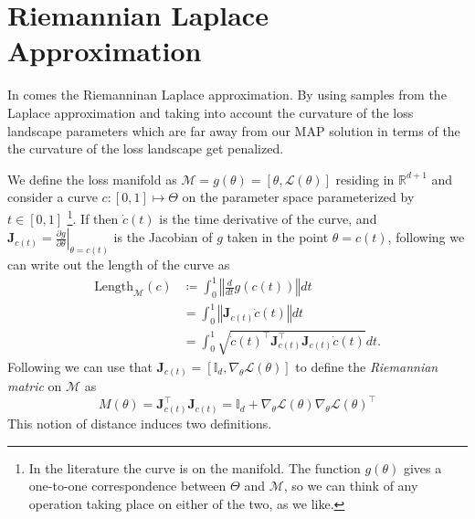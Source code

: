 \section{Riemannian Laplace Approximation}
In comes the Riemanninan Laplace approximation. By using samples from the Laplace approximation and taking into account the curvature of the loss landscape parameters which are far away from our MAP solution in terms of the the curvature of the loss landscape get penalized.

We define the loss manifold as $\mathcal M = g(\theta) = [\theta, \mathcal L(\theta)]$ residing in $\mathbb R^{d+1}$ and consider a curve $c:[0,1] \mapsto \Theta$ on the parameter space parameterized by $t\in [0,1]$ \footnote{In the literature the curve is on the manifold. The function $g(\theta)$ gives a one-to-one correspondence between $\Theta$ and $\mathcal M$, so we can think of any operation taking place on either of the two, as we like.}. If then $\dot c(t)$ is the time derivative of the curve, and $\bm J_{c(t)} = \left. \frac{\partial g}{\partial \theta} \right \vert_{\theta = c(t)}$ is the Jacobian of $g$ taken in the point $\theta=c(t)$, following \cite{Hauberg2025} we can write out the length of the curve as 
\begin{align*}
    \text{Length}_\mathcal M (c) 
    &\coloneq \int_0^1 \left\Vert \frac{d}{dt} g(c(t)) \right\Vert dt\\
    &= \int_0^1 \left\Vert \bm J_{c(t)} \dot c(t) \right\Vert dt\\
    &= \int_0^1 \sqrt{\dot c(t)^\top  \bm J_{c(t)}^\top \bm J_{c(t)} \dot c(t)} dt.
\end{align*}
Following \cite{bergamin2023riemannian} we can use that $\bm J_{c(t)} = [\mathbb I_d, \nabla_\theta \mathcal L(\theta)]$ to define the \emph{Riemannian matric} on $\mathcal M$ as 
\begin{equation}
M(\theta) = \bm J_{c(t)}^\top \bm J_{c(t)} = \mathbb I_d + \nabla_\theta \mathcal L(\theta) \nabla_\theta \mathcal L(\theta)^\top    \label{eq:riemann_metric}
\end{equation}
This notion of distance induces two definitions. 

